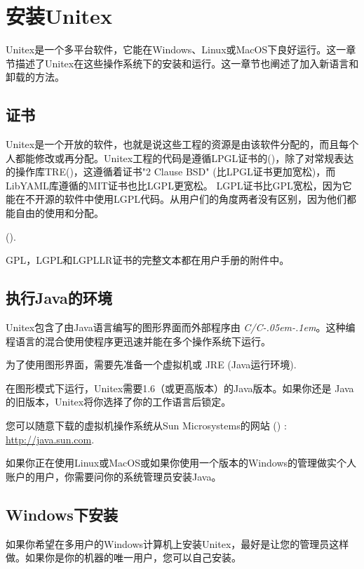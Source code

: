 \chapter{安装Unitex}
\label{chap-install}
Unitex是一个多平台软件，它能在Windows、Linux或MacOS下良好运行。这一章节描述了Unitex在这些操作系统下的安装和运行。这一章节也阐述了加入新语言和卸载的方法。

\section{证书}
\label{section-licences}
Unitex是一个开放的软件，也就是说这些工程的资源是由该软件分配的，而且每个人都能修改或再分配。Unitex工程的代码是遵循LPGL证书的(\cite{LGPL})，除了对常规表达的操作库TRE(\cite{TRE})，这遵循着证书"2 Clause BSD" (比LPGL证书更加宽松)，而LibYAML库遵循的MIT证书也比LGPL更宽松。
LGPL证书比GPL宽松，因为它能在不开源的软件中使用LGPL代码。从用户们的角度两者没有区别，因为他们都能自由的使用和分配。

\bigskip
{}
 (\cite{LGPLLR}).

\bigskip
\noindent GPL，LGPL和LGPLLR证书的完整文本都在用户手册的附件中。

\section{执行Java的环境}
Unitex包含了由Java语言编写的图形界面而外部程序由 \textit{C/C\kern-.05em\raisebox{.5ex}{++}\kern-.1em}。这种编程语言的混合使用使程序更迅速并能在多个操作系统下运行。


\bigskip
\noindent 为了使用图形界面，需要先准备一个虚拟机或
JRE (Java运行环境).

\bigskip
\noindent 在图形模式下运行，Unitex需要1.6（或更高版本）的Java版本。如果你还是        Java的旧版本，Unitex将你选择了你的工作语言后锁定。

\bigskip
\noindent 您可以随意下载的虚拟机操作系统从Sun Microsystems的网站 (\cite{site-java}) : 
\url{http://java.sun.com}.

\bigskip
\noindent 如果你正在使用Linux或MacOS或如果你使用一个版本的Windows的管理做实个人账户的用户，你需要问你的系统管理员安装Java。



\section{Windows下安装}
如果你希望在多用户的Windows计算机上安装Unitex，最好是让您的管理员这样做。如果你是你的机器的唯一用户，您可以自己安装。



